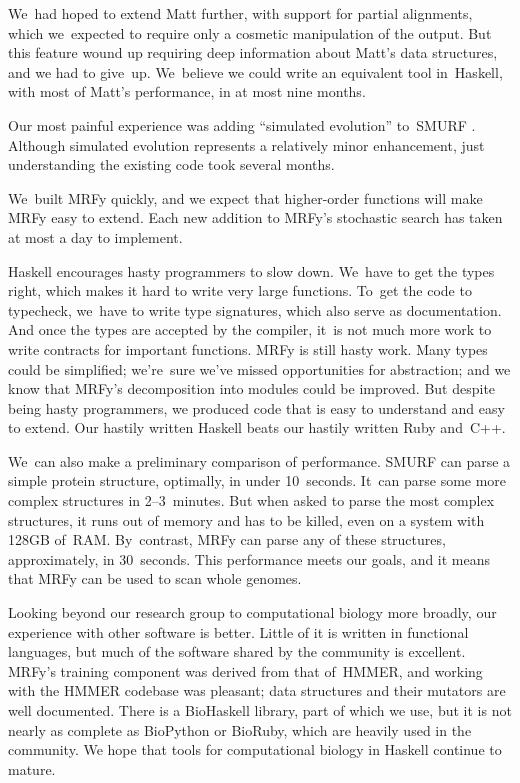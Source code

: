 \documentclass[nonatbib]{sigplanconf}
\let\cite\citep
\begin{document}
We~had hoped to extend Matt further, with support for partial alignments,
which we~expected to require only 
a cosmetic manipulation of the 
output.
But
this feature wound up
requiring deep information about Matt's data structures,
and we had to give~up.
We~believe we could write an equivalent tool in~Haskell,
with most of Matt's performance, in at most nine months.

Our most painful experience was adding ``simulated evolution''
to~SMURF \cite{Daniels:2012}. 
Although simulated evolution represents a relatively minor
enhancement,
just understanding the existing code took several months.

We~built MRFy quickly, and we expect that
higher-order functions will make MRFy easy to extend.
Each new addition to MRFy's stochastic search has taken at most a day
to implement.

Haskell encourages hasty programmers to slow down.
We~have to get the types right,
which makes it hard to write very large functions.
To~get the code to typecheck, we~have to write type signatures, which
also serve as documentation.
And once the types are accepted by the compiler,
it~is not much more work to write contracts for important functions.
MRFy is still hasty work.
Many types could be simplified;
we're~sure we've missed opportunities for abstraction;
and we know that MRFy's decomposition into modules could be improved.
But despite being hasty programmers, we produced code 
that is easy to understand and easy to extend.
Our hastily written Haskell beats
our hastily written Ruby and~C++.

We~can also make a preliminary comparison of performance.
SMURF can parse a simple protein structure, optimally, in under 10~seconds.
It~can parse some more complex structures in 2--3~minutes.
But when asked to parse the most complex structures, it runs out of
memory and has to be killed, even on a system with 128GB of~RAM.
By~contrast, MRFy can parse any of these structures, approximately,
in 30~seconds.
This performance
meets our goals, and it means that MRFy can be used to scan whole genomes.




Looking beyond our research group to computational biology more
broadly, our experience with other software is better.
Little of it is written in functional languages, 
but much of the software shared by the community is excellent.
MRFy's training component was derived from that of~HMMER,
and
working with the HMMER 
codebase was pleasant;
data structures and their
mutators are well documented. 
There is a 
BioHaskell library, part of which we use,
but it is not nearly as 
complete as BioPython or BioRuby, which are heavily used in the community.
We hope that tools for computational biology in
Haskell continue to mature. 
\end{document}
